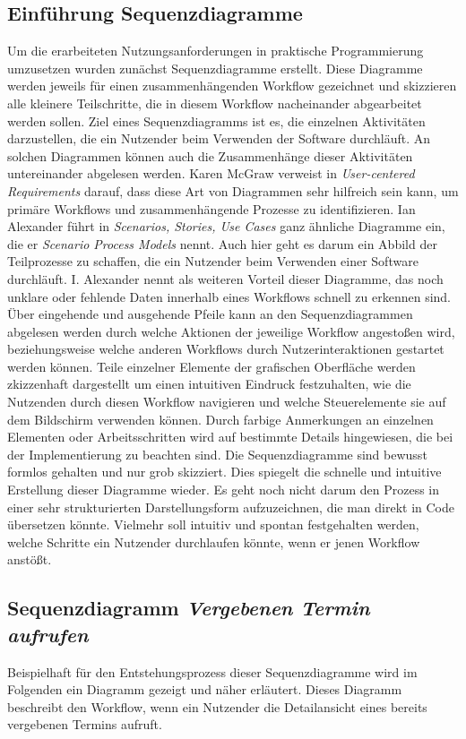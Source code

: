 \subsection{Einführung Sequenzdiagramme}
Um die erarbeiteten Nutzungsanforderungen in praktische Programmierung
umzusetzen wurden zunächst Sequenzdiagramme erstellt. Diese Diagramme werden
jeweils für einen zusammenhängenden Workflow gezeichnet und skizzieren alle
kleinere Teilschritte, die in diesem Workflow nacheinander abgearbeitet werden
sollen. Ziel eines Sequenzdiagramms ist es, die einzelnen Aktivitäten
darzustellen, die ein Nutzender beim Verwenden der Software
durchläuft\cite{holtzblattCDEvolved}. An solchen Diagrammen können auch die
Zusammenhänge dieser Aktivitäten untereinander abgelesen werden. Karen McGraw
verweist in \textit{User-centered Requirements} darauf, dass diese Art von
Diagrammen sehr hilfreich sein kann, um primäre Workflows und zusammenhängende
Prozesse zu identifizieren\cite{sequenceDiagrams}. Ian Alexander führt in
\textit{Scenarios, Stories, Use Cases} ganz ähnliche Diagramme ein, die er
\textit{Scenario Process Models} nennt. Auch hier geht es darum ein Abbild der
Teilprozesse zu schaffen, die ein Nutzender beim Verwenden einer Software
durchläuft. I. Alexander nennt als weiteren Vorteil dieser Diagramme, das noch
unklare oder fehlende Daten innerhalb eines Workflows schnell zu erkennen sind.
Über eingehende und ausgehende Pfeile kann an den Sequenzdiagrammen abgelesen
werden durch welche Aktionen der jeweilige Workflow angestoßen wird,
beziehungsweise welche anderen Workflows durch Nutzerinteraktionen gestartet
werden können. Teile einzelner Elemente der grafischen Oberfläche werden
zkizzenhaft dargestellt um einen intuitiven Eindruck festzuhalten, wie die
Nutzenden durch diesen Workflow navigieren und welche Steuerelemente sie auf
dem Bildschirm verwenden können. Durch farbige Anmerkungen an einzelnen
Elementen oder Arbeitsschritten wird auf bestimmte Details hingewiesen, die bei
der Implementierung zu beachten sind. Die Sequenzdiagramme sind bewusst formlos
gehalten und nur grob skizziert. Dies spiegelt die schnelle und intuitive
Erstellung dieser Diagramme wieder. Es geht noch nicht darum den Prozess in
einer sehr strukturierten Darstellungsform aufzuzeichnen, die man direkt in
Code übersetzen könnte. Vielmehr soll intuitiv und spontan festgehalten werden,
welche Schritte ein Nutzender durchlaufen könnte, wenn er jenen Workflow
anstößt.

\subsection{Sequenzdiagramm \textit{Vergebenen Termin aufrufen}}
Beispielhaft für den Entstehungsprozess dieser Sequenzdiagramme wird im
Folgenden ein Diagramm gezeigt und näher erläutert. Dieses Diagramm beschreibt
den Workflow, wenn ein Nutzender die Detailansicht eines bereits vergebenen
Termins aufruft.


